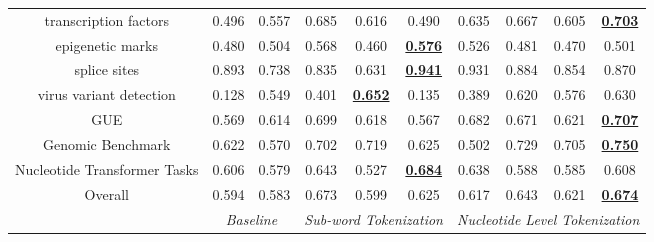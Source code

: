 \begin{table*}[]
\begin{center}
\begin{tabular}{@{}c|cc|ccc|cccc@{}}
transcription factors & 0.496 & 0.557 & 0.685 & 0.616 & 0.490 & 0.635 & 0.667 & 0.605 & \textbf{\underline{0.703}} \\
epigenetic marks & 0.480 & 0.504 & 0.568 & 0.460 & \textbf{\underline{0.576}} & 0.526 & 0.481 & 0.470 & 0.501 \\
splice sites & 0.893 & 0.738 & 0.835 & 0.631 & \textbf{\underline{0.941}} & 0.931 & 0.884 & 0.854 & 0.870 \\
virus variant detection & 0.128 & 0.549 & 0.401 & \textbf{\underline{0.652}} & 0.135 & 0.389 & 0.620 & 0.576 & 0.630 \\
\midrule
GUE & 0.569 & 0.614 & 0.699 & 0.618 & 0.567 & 0.682 & 0.671 & 0.621 & \textbf{\underline{0.707}} \\
Genomic Benchmark & 0.622 & 0.570 & 0.702 & 0.719 & 0.625 & 0.502 & 0.729 & 0.705 & \textbf{\underline{0.750}} \\
Nucleotide Transformer Tasks & 0.606 & 0.579 & 0.643 & 0.527 & \textbf{\underline{0.684}} & 0.638 & 0.588 & 0.585 & 0.608 \\
\midrule
Overall & 0.594 & 0.583 & 0.673 & 0.599 & 0.625 & 0.617 & 0.643 & 0.621 & \textbf{\underline{0.674}} \\
\midrule
\multicolumn{1}{l|}{} & \multicolumn{2}{c|}{\textit{Baseline}} & \multicolumn{3}{c|}{\textit{Sub-word Tokenization}} & \multicolumn{4}{c}{\textit{Nucleotide Level Tokenization}}
\end{tabular}
\end{center}
\end{table*}